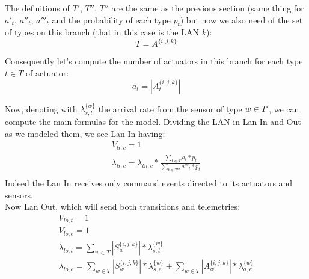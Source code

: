 \documentclass[11pt]{article}
\begin{document}
The definitions of $T'$, $T''$, $T''$ are the same as the previous section (same thing for $a'_t$, $a''_t$, $a'''_t$ and the probability of each type $p_t$) but now we also need of the set of types on this branch (that in this case is the LAN $k$):
\begin{equation}
    T = A^{\{i, j, k\}}
\end{equation}

Consequently let's compute the number of actuators in this branch for each type $t \in T$ of actuator:
\begin{equation}
    a_{t} = | A^{\{i, j, k\}}_{t} |
\end{equation}

Now, denoting with $\lambda^{\{w\}}_{s, t}$ the arrival rate from the sensor of type $w \in T'$, we can compute the main formulas for the model.
Dividing the LAN in Lan In and Out as we modeled them, we see Lan In having:
\begin{equation}
    \begin{array}{l}
        V_{li,c} = 1 \\
		\lambda_{li, c} = \lambda_{ln, c} * \frac{\sum\limits_{t \in T}{a_{t} * p_{t}}}{\sum\limits_{t \in T'''}{a'''_{t} * p_{t}}}  \\\

    \end{array}
\end{equation}
Indeed the Lan In receives only command events  directed to its actuators and sensors.\\
Now Lan Out, which will send both transitions and telemetries:
\begin{equation}
    \begin{array}{l}
        V_{lo, t} = 1 \\
        V_{lo, e} = 1 \\ %
        \lambda_{lo, t} = \sum\limits_{w \in T}{| S^{\{i,j,k\}}_{w} | * \lambda^{\{w\}}_{s, t}}  \\
        \lambda_{lo, e} = \sum\limits_{w \in T}{| S^{\{i,j,k\}}_{w} | * \lambda^{\{w\}}_{s, e}} + \sum\limits_{w \in T}{| A^{\{i,j,k\}}_{w} | * \lambda^{\{w\}}_{a, e}}\\


    \end{array}
\end{equation}
\end{document}
